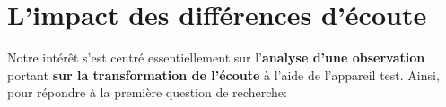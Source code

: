 	







 \section{ L'impact des différences d'écoute }
 Notre intérêt s'est centré essentiellement sur l'\textbf{analyse d'une
 	observation}
 portant \textbf{sur la transformation de l'écoute} à l'aide de
 l'appareil test.
  Ainsi, pour répondre à la première question de recherche: 
